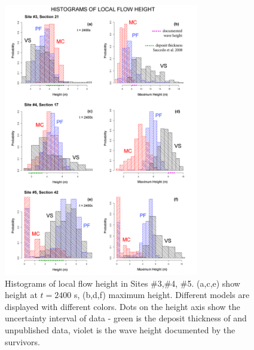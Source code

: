 \documentclass[nhess, manuscript]{copernicus}
\begin{document}
\begin{figure}[H]
\centering
\includegraphics[width=0.76\textwidth]{Fig8.png}
\caption{Histograms of local flow height in Sites \#3,\#4, \#5. (a,c,e) show height at $t=2400$ s, (b,d,f) maximum height. Different models are displayed with different colors. Dots on the height axis show the uncertainty interval of data - green is the deposit thickness of \cite{Saucedo2008} and unpublished data, violet is the wave height documented by the survivors.}
\label{Fig8}
\end{figure}
\end{document}
